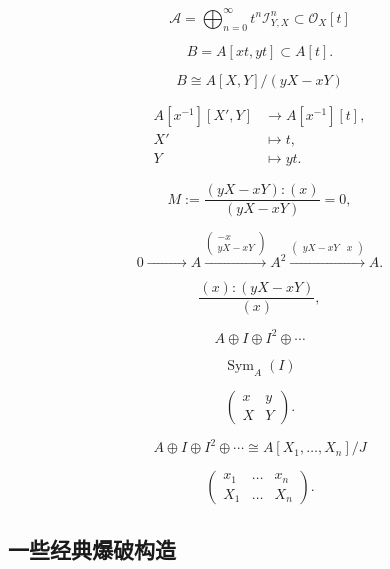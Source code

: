 \[
	\mathscr A=\bigoplus_{n=0}^\infty t^n\mathscr I_{Y,X}^n\subset \mathscr O_X[t]
\]


\[
	B=A[xt,yt]\subset A[t].
\]

\[
	B\cong A[X,Y]/(yX-xY)
\]

\[
	\begin{aligned}
		A[x^{-1}][X',Y] & \longrightarrow A[x^{-1}][t],\\
		X' &\longmapsto t,\\
		Y  &\longmapsto yt.
	\end{aligned}
\]

\[
	M:=\frac{(yX-xY):(x)}{(yX-xY)}=0,
\]

\[
	0\xrightarrow{\qquad\quad\quad} A \xrightarrow{
	\begin{pmatrix}
		-x\\ yX-xY
	\end{pmatrix}}A^2
	\xrightarrow{\begin{pmatrix}
		yX-xY& x
	\end{pmatrix}}A.
\]

\[
	\frac{(x):(yX-xY)}{(x)},
\]


\[
	A\oplus I \oplus I^2\oplus \cdots
\]

\[
	\operatorname{Sym}_A(I)
\]

\[
	\begin{pmatrix}
		x&y\\
		X&Y
	\end{pmatrix}.
\]

\[
	A\oplus I \oplus I^2\oplus \cdots\cong A[X_1,\dots,X_n]/J
\]

\[
	\begin{pmatrix}
		x_1&\dots&x_n\\
		X_1&\dots&X_n
	\end{pmatrix}.
\]

\subsection{一些经典爆破构造}\label{s:4.2.2}